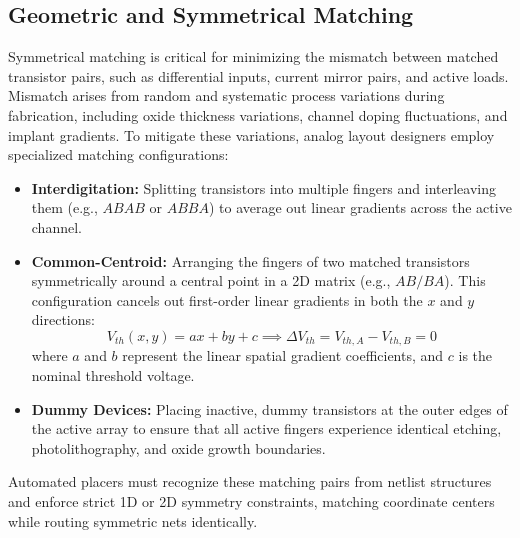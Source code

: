 \subsection{Geometric and Symmetrical Matching}
Symmetrical matching is critical for minimizing the mismatch between matched transistor pairs, such as differential inputs, current mirror pairs, and active loads. Mismatch arises from random and systematic process variations during fabrication, including oxide thickness variations, channel doping fluctuations, and implant gradients. To mitigate these variations, analog layout designers employ specialized matching configurations:
\begin{itemize}
    \item \textbf{Interdigitation:} Splitting transistors into multiple fingers and interleaving them (e.g., $ABAB$ or $ABBA$) to average out linear gradients across the active channel.
    \item \textbf{Common-Centroid:} Arranging the fingers of two matched transistors symmetrically around a central point in a 2D matrix (e.g., $A B / B A$). This configuration cancels out first-order linear gradients in both the $x$ and $y$ directions:
    \begin{equation}
        V_{th}(x,y) = ax + by + c \implies \Delta V_{th} = V_{th,A} - V_{th,B} = 0
    \end{equation}
    where $a$ and $b$ represent the linear spatial gradient coefficients, and $c$ is the nominal threshold voltage.
    \item \textbf{Dummy Devices:} Placing inactive, dummy transistors at the outer edges of the active array to ensure that all active fingers experience identical etching, photolithography, and oxide growth boundaries.
\end{itemize}
Automated placers must recognize these matching pairs from netlist structures and enforce strict 1D or 2D symmetry constraints, matching coordinate centers while routing symmetric nets identically.

